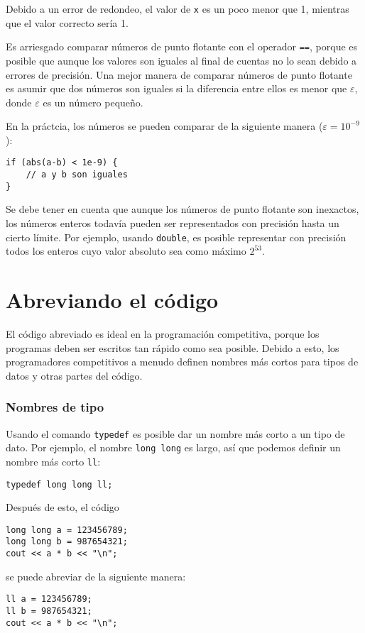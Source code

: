 Debido a un error de redondeo,
el valor de \texttt{x} es un poco menor que 1,
mientras que el valor correcto sería 1.

Es arriesgado comparar números de punto flotante
con el operador \texttt{==},
porque es posible que aunque los valores son iguales 
al final de cuentas no lo sean debido a errores de precisión.
Una mejor manera de comparar números de punto flotante
es asumir que dos números son iguales
si la diferencia entre ellos es menor que $\varepsilon$,
donde $\varepsilon$ es un número pequeño.

En la práctcia, los números se pueden comparar
de la siguiente manera ($\varepsilon=10^{-9}$):

\begin{lstlisting}
if (abs(a-b) < 1e-9) {
    // a y b son iguales
}
\end{lstlisting}

Se debe tener en cuenta que aunque los números de punto flotante son inexactos,
los números enteros todavía pueden ser
representados con precisión hasta un cierto límite.
Por ejemplo, usando \texttt{double},
es posible representar con precisión todos
los enteros cuyo valor absoluto sea como máximo $2^{53}$.

\section{Abreviando el código}

El código abreviado es ideal en la programación competitiva,
porque los programas deben ser escritos
tan rápido como sea posible.
Debido a esto, los programadores competitivos a menudo definen
nombres más cortos para tipos de datos y otras partes del código.

\subsubsection{Nombres de tipo}
Usando el comando \texttt{typedef}
es posible dar un nombre más corto
a un tipo de dato.
Por ejemplo, el nombre \texttt{long long} es largo,
así que podemos definir un nombre más corto \texttt{ll}:
\begin{lstlisting}
typedef long long ll;
\end{lstlisting}
Después de esto, el código
\begin{lstlisting}
long long a = 123456789;
long long b = 987654321;
cout << a * b << "\n";
\end{lstlisting}
se puede abreviar de la siguiente manera:
\begin{lstlisting}
ll a = 123456789;
ll b = 987654321;
cout << a * b << "\n";
\end{lstlisting}

